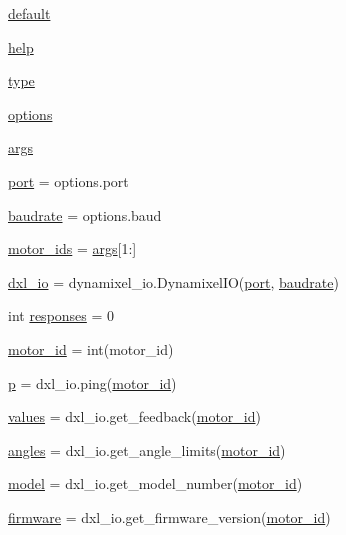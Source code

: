 \begin{DoxyCompactItemize}
\hyperlink{namespaceinfo__dump_a82df11e8a469a00e4d6cd392074a43bf}{default}
\item 
\hyperlink{namespaceinfo__dump_aa86ebeaa3c5aac015d0d9c03879df060}{help}
\item 
\hyperlink{namespaceinfo__dump_ac238d5ac975ddd9eb9ea696b9dabe4b2}{type}
\item 
\hyperlink{namespaceinfo__dump_a7d6b1021261929bba75323767de00e7c}{options}
\item 
\hyperlink{namespaceinfo__dump_a027c02ad18aa7a853a517433230af8a1}{args}
\item 
\hyperlink{namespaceinfo__dump_a6a0b57c32b7abb158439bb4e8b370c45}{port} = options.\+port
\item 
\hyperlink{namespaceinfo__dump_aa7d6b35ec273c6b59d04e755217a0134}{baudrate} = options.\+baud
\item 
\hyperlink{namespaceinfo__dump_ace0a37572cece800e11d67ce29077e98}{motor\+\_\+ids} = \hyperlink{namespaceinfo__dump_a027c02ad18aa7a853a517433230af8a1}{args}\mbox{[}1\+:\mbox{]}
\item 
\hyperlink{namespaceinfo__dump_abfbf78081220a30aef2aa3d8a46d4d0c}{dxl\+\_\+io} = dynamixel\+\_\+io.\+Dynamixel\+IO(\hyperlink{namespaceinfo__dump_a6a0b57c32b7abb158439bb4e8b370c45}{port}, \hyperlink{namespaceinfo__dump_aa7d6b35ec273c6b59d04e755217a0134}{baudrate})
\item 
int \hyperlink{namespaceinfo__dump_a41f2b166246844d080d65665e4335e98}{responses} = 0
\item 
\hyperlink{namespaceinfo__dump_ab8304b7617ad78e51a49ee40b5f2f3fc}{motor\+\_\+id} = int(motor\+\_\+id)
\item 
\hyperlink{namespaceinfo__dump_a4121bc21863b0d4380aac92a52617fd0}{p} = dxl\+\_\+io.\+ping(\hyperlink{namespaceinfo__dump_ab8304b7617ad78e51a49ee40b5f2f3fc}{motor\+\_\+id})
\item 
\hyperlink{namespaceinfo__dump_a519d64383e606d3ddaff0c01f233d087}{values} = dxl\+\_\+io.\+get\+\_\+feedback(\hyperlink{namespaceinfo__dump_ab8304b7617ad78e51a49ee40b5f2f3fc}{motor\+\_\+id})
\item 
\hyperlink{namespaceinfo__dump_ad900b8834233c7b841ac28883ba3e854}{angles} = dxl\+\_\+io.\+get\+\_\+angle\+\_\+limits(\hyperlink{namespaceinfo__dump_ab8304b7617ad78e51a49ee40b5f2f3fc}{motor\+\_\+id})
\item 
\hyperlink{namespaceinfo__dump_a7b8b18c2843714130e2cf0f9859565d7}{model} = dxl\+\_\+io.\+get\+\_\+model\+\_\+number(\hyperlink{namespaceinfo__dump_ab8304b7617ad78e51a49ee40b5f2f3fc}{motor\+\_\+id})
\item 
\hyperlink{namespaceinfo__dump_a24cc6416ad6ea3ee4cf38bf57e886c70}{firmware} = dxl\+\_\+io.\+get\+\_\+firmware\+\_\+version(\hyperlink{namespaceinfo__dump_ab8304b7617ad78e51a49ee40b5f2f3fc}{motor\+\_\+id})
\end{DoxyCompactItemize}


